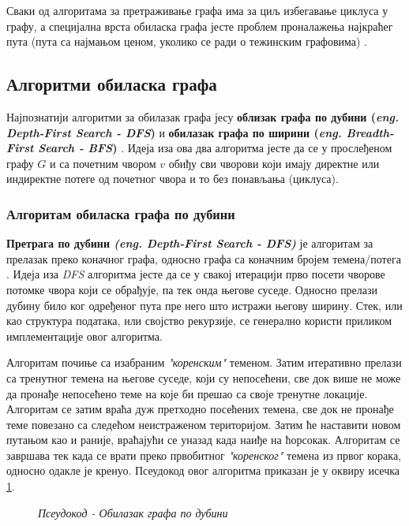 \par
Сваки од алгоритама за претраживање графа има за циљ избегавање циклуса у графу, а специјална врста обиласка графа јесте проблем проналажења најкраћег пута (пута са најмањом ценом, уколико се ради о тежинским графовима) \cite{traveling-salesman}.

\subsection{Алгоритми обиласка графа}
Најпознатији алгоритми за обилазак графа јесу \textbf{облизак графа по дубини (\textit{eng. Depth-First Search - DFS})} \cite{graph-algorithms} и \textbf{обилазак графа по ширини (\textit{eng. Breadth-First Search - BFS})} \cite{graph-algorithms}. Идеја иза ова два алгоритма јесте да се у прослеђеном графу $G$ и са почетним чвором $v$ обиђу сви чворови који имају директне или индиректне потеге од почетног чвора и то без понављања (циклуса).

\subsubsection{Алгоритам обиласка графа по дубини}
\textbf{Претрага по дубини \textit{(eng. Depth-First Search - DFS)}} је алгоритам за прелазак преко коначног графа, односно графа са коначним бројем темена/потега \cite{graph-algorithms}. Идеја иза \textit{DFS} алгоритма јесте да се у свакој итерацији прво посети чворове потомке чвора који се обрађује, па тек онда његове суседе. Односно прелази дубину било ког одређеног пута пре него што истражи његову ширину. Стек, или као структура података, или својство рекурзије, се генерално користи приликом имплементације овог алгоритма.

\par
Алгоритам почиње са изабраним \textit{"коренским"} теменом. Затим итеративно прелази са тренутног темена на његове суседе, који су непосећени, све док више не може да пронађе непосећено теме на које би прешао са своје тренутне локације. Алгоритам се затим враћа дуж претходно посећених темена, све док не пронађе теме повезано са следећом неистраженом територијом. Затим ће наставити новом путањом као и раније, враћајући се уназад када наиђе на ћорсокак. Алгоритам се завршава тек када се врати преко првобитног \textit{"коренског"} темена из првог корака, односно одакле је кренуо. Псеудокод овог алгоритма приказан је у оквиру исечка \ref{pseudocode:algorithm-dfs-traversal-pseudo}.

\begin{figure}[!ht]
\centering

\caption{\textit{Псеудокод - Обилазак графа по дубини}}
\label{pseudocode:algorithm-dfs-traversal-pseudo}
\end{figure}

